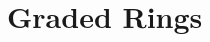 \documentclass[../main]{subfiles}
\begin{document}
\chapter{Graded Rings}\label{ch:04}

\setcounter{section}{9}


\end{document}
